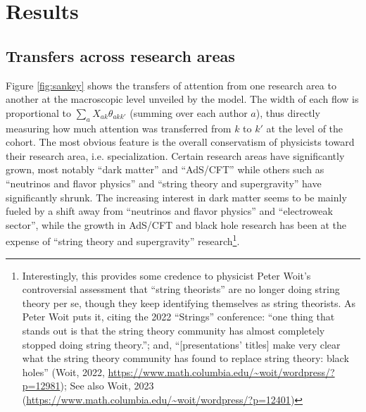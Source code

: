 \documentclass{article}
\begin{document}
 \section{\label{sec:results}Results}

 \subsection{\label{sec:macro}Transfers across research areas}

Figure \ref{fig:sankey} shows the transfers of attention from one research area to another at the macroscopic level unveiled by the model. The width of each flow is proportional to $\sum_a X_{ak}\theta_{akk'}$ (summing over each author $a$), thus directly measuring how much attention was transferred from $k$ to $k'$ at the level of the cohort. The most obvious feature is the overall conservatism of physicists toward their research area, i.e. specialization. Certain research areas have significantly grown, most notably ``dark matter'' and ``AdS/CFT'' while others such as ``neutrinos and flavor physics'' and ``string theory and supergravity'' have significantly shrunk. %
The increasing interest in dark matter seems to be mainly fueled by a shift away from ``neutrinos and flavor physics'' and ``electroweak sector'', while the growth in AdS/CFT and black hole research has been at the expense of ``string theory and supergravity'' research\footnote{Interestingly, this provides some credence to physicist Peter Woit's controversial assessment that ``string theorists'' are no longer doing string theory per se, though they keep identifying themselves as string theorists. As Peter Woit puts it, citing the 2022 ``Strings'' conference: ``one thing that stands out is that the string theory community has almost completely stopped doing string theory.''; and, ``[presentations' titles] make very clear what the string theory community has found to replace string theory: black holes'' (Woit, 2022, \url{https://www.math.columbia.edu/~woit/wordpress/?p=12981}); See also Woit, 2023 (\url{https://www.math.columbia.edu/~woit/wordpress/?p=12401})}. 
\end{document}
